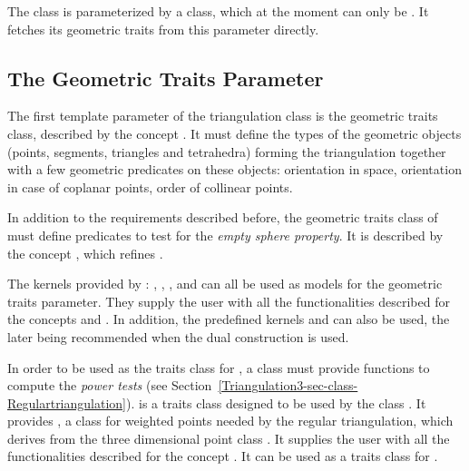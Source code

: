 The class  is parameterized by a class, which at
the moment can only be .  It fetches its
geometric traits from this parameter directly.

\subsection{The Geometric Traits Parameter\label{Triangulation3-sec-Traits}}

The first template parameter of the triangulation class
is the geometric traits class, described by the concept
.  It must define the types of the geometric objects
(points, segments, triangles and tetrahedra) forming the triangulation together
with a few geometric predicates on these objects: orientation in space,
orientation in case of coplanar points, order of collinear points.

In addition to the requirements described before, the geometric traits
class of  must define predicates to test for the
\textit{empty sphere property}.  It is described by the concept
, which refines .

The kernels provided by \cgal: , ,
,  and
 can all be used as models for the geometric traits
parameter.
They supply the user with all the functionalities described for the concepts
 and
.
In addition, the predefined kernels
 and
can also be used, the later being recommended when the dual construction is
used.

In order to be used as the traits class for ,
a class must provide functions to compute the \textit{power tests}
(see Section~\ref{Triangulation3-sec-class-Regulartriangulation}).
 is a traits class 
 designed to be used by the class
. It provides
, a class for weighted points
needed by the regular triangulation, which derives from the three dimensional
point class .
It supplies the user with all the functionalities 
described for the concept . 
It can be used as a traits class for
.

